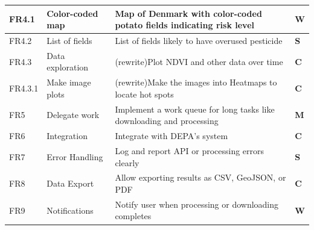 \begin{longtable}{|p{1.2cm}|p{4cm}|p{6cm}|p{1.2cm}|}
\hline
FR4.1 & Color-coded map & Map of Denmark with color-coded potato fields indicating risk level & \textbf{W} \\
\hline
FR4.2 & List of fields & List of fields likely to have overused pesticide & \textbf{S} \\
\hline
FR4.3 & Data exploration & (rewrite)Plot NDVI and other data over time & \textbf{C} \\
\hline
FR4.3.1 & Make image plots & (rewrite)Make the images into Heatmaps to locate hot spots & \textbf{C} \\
\hline
FR5 & Delegate work & Implement a work queue for long tasks like downloading and processing & \textbf{M} \\
\hline
FR6 & Integration & Integrate with DEPA's system & \textbf{C} \\
\hline
FR7 & Error Handling & Log and report API or processing errors clearly & \textbf{S} \\
\hline
FR8 & Data Export & Allow exporting results as CSV, GeoJSON, or PDF & \textbf{C} \\
\hline
FR9 & Notifications & Notify user when processing or downloading completes & \textbf{W} \\
\hline
\end{longtable}